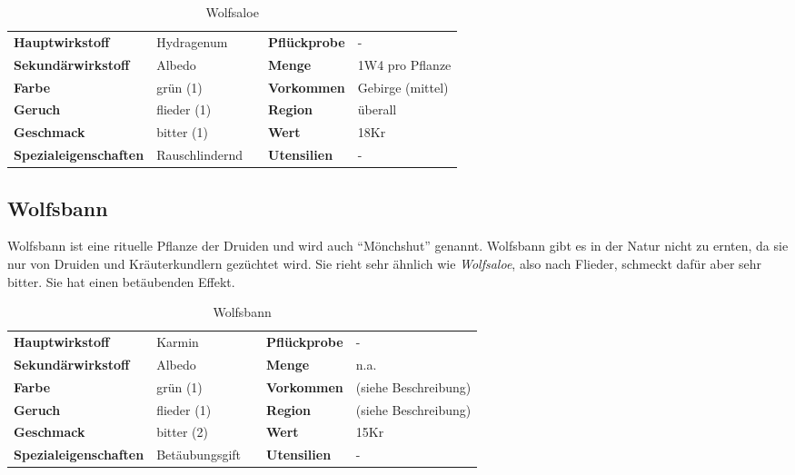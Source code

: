 \begin{table}[h] 
\begin{center} 
\begin{tabular}{|l|l|p{1cm}|l|l|} 
  	\cline{1-2} \cline{4-5} 
  	\textbf{Hauptwirkstoff} & Hydragenum && \textbf{Pflückprobe} & - \\ \cline{1-2} \cline{4-5} 
  	\textbf{Sekundärwirkstoff} & Albedo && \textbf{Menge} & 1W4 pro Pflanze \\ \cline{1-2} \cline{4-5} 
  	\textbf{Farbe} & grün (1) && \textbf{Vorkommen} & Gebirge (mittel) \\ \cline{1-2} \cline{4-5} 
  	\textbf{Geruch} & flieder (1) && \textbf{Region} & überall \\ \cline{1-2} \cline{4-5} 
  	\textbf{Geschmack} & bitter (1) && \textbf{Wert} & 18Kr \\ \cline{1-2} \cline{4-5} 
  	\textbf{Spezialeigenschaften} & Rauschlindernd && \textbf{Utensilien} & - \\ \cline{1-2} \cline{4-5} 
\end{tabular} 
\end{center} 
\caption{Wolfsaloe} 
\label{tab:wolfsaloe} 
\end{table}

\subsection{Wolfsbann}
Wolfsbann ist eine rituelle Pflanze der Druiden und wird auch "`Mönchshut"' genannt. Wolfsbann gibt es in der Natur nicht zu ernten, da sie nur von Druiden und Kräuterkundlern gezüchtet wird. Sie rieht sehr ähnlich wie \textit{Wolfsaloe}, also nach Flieder, schmeckt dafür aber sehr bitter. Sie hat einen betäubenden Effekt.

\begin{table}[h] 
\begin{center} 
\begin{tabular}{|l|l|p{1cm}|l|l|} 
  	\cline{1-2} \cline{4-5} 
  	\textbf{Hauptwirkstoff} & Karmin && \textbf{Pflückprobe} & - \\ \cline{1-2} \cline{4-5} 
  	\textbf{Sekundärwirkstoff} & Albedo && \textbf{Menge} & n.a. \\ \cline{1-2} \cline{4-5} 
  	\textbf{Farbe} & grün (1) && \textbf{Vorkommen} & (siehe Beschreibung) \\ \cline{1-2} \cline{4-5} 
  	\textbf{Geruch} & flieder (1) && \textbf{Region} & (siehe Beschreibung) \\ \cline{1-2} \cline{4-5} 
  	\textbf{Geschmack} & bitter (2) && \textbf{Wert} & 15Kr \\ \cline{1-2} \cline{4-5} 
  	\textbf{Spezialeigenschaften} & Betäubungsgift && \textbf{Utensilien} & - \\ \cline{1-2} \cline{4-5} 
\end{tabular} 
\end{center} 
\caption{Wolfsbann} 
\label{tab:wolfsbann} 
\end{table}

